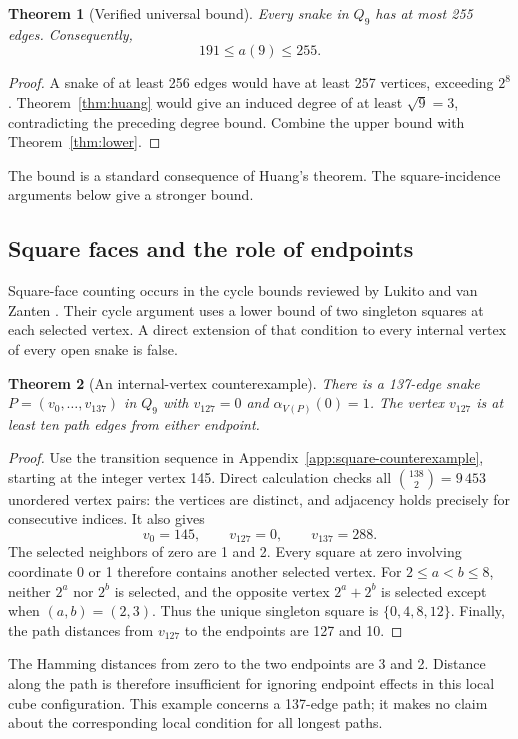 \documentclass[11pt,a4paper]{article}
\newtheorem{theorem}{Theorem}[section]
\theoremstyle{definition}
\theoremstyle{remark}
\newcommand{\Q}{Q}
\begin{document}
\begin{theorem}[Verified universal bound]\label{thm:upper}
Every snake in $\Q_9$ has at most 255 edges. Consequently,
\[
\boxed{191\le a(9)\le255.}
\]
\end{theorem}
\begin{proof}
A snake of at least 256 edges would have at least 257 vertices, exceeding $2^8$. Theorem~\ref{thm:huang} would give an induced degree of at least $\sqrt9=3$, contradicting the preceding degree bound. Combine the upper bound with Theorem~\ref{thm:lower}.
\end{proof}
The bound is a standard consequence of Huang's theorem. The square-incidence arguments below give a stronger bound.

\subsection{Square faces and the role of endpoints}
Square-face counting occurs in the cycle bounds reviewed by Lukito and van Zanten \cite{lukito}. Their cycle argument uses a lower bound of two singleton squares at each selected vertex. A direct extension of that condition to every internal vertex of every open snake is false.

\begin{theorem}[An internal-vertex counterexample]\label{thm:square-counterexample}
There is a 137-edge snake $P=(v_0,\ldots,v_{137})$ in $\Q_9$ with $v_{127}=0$ and $\alpha_{V(P)}(0)=1$. The vertex $v_{127}$ is at least ten path edges from either endpoint.
\end{theorem}
\begin{proof}
Use the transition sequence in Appendix~\ref{app:square-counterexample}, starting at the integer vertex 145. Direct calculation checks all $\binom{138}{2}=9\,453$ unordered vertex pairs: the vertices are distinct, and adjacency holds precisely for consecutive indices. It also gives
\[
v_0=145,\qquad v_{127}=0,\qquad v_{137}=288.
\]
The selected neighbors of zero are 1 and 2. Every square at zero involving coordinate 0 or 1 therefore contains another selected vertex. For $2\le a<b\le8$, neither $2^a$ nor $2^b$ is selected, and the opposite vertex $2^a+2^b$ is selected except when $(a,b)=(2,3)$. Thus the unique singleton square is $\{0,4,8,12\}$. Finally, the path distances from $v_{127}$ to the endpoints are 127 and 10.
\end{proof}
The Hamming distances from zero to the two endpoints are 3 and 2. Distance along the path is therefore insufficient for ignoring endpoint effects in this local cube configuration. This example concerns a 137-edge path; it makes no claim about the corresponding local condition for all longest paths.
\end{document}
